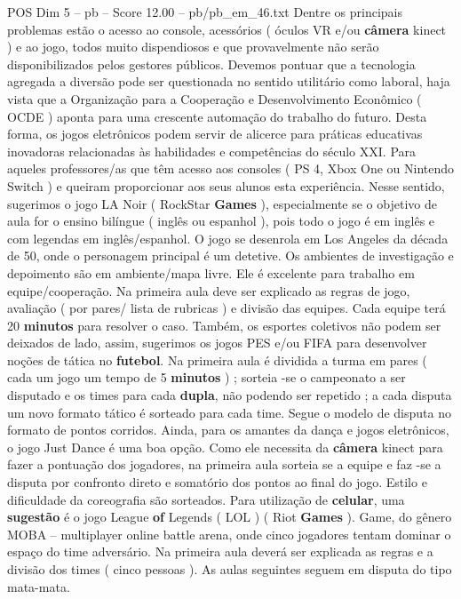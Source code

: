 \begin{textsample}{POS Dim 5 – pb – Score 12.00 – pb/pb\_em\_46.txt}
Dentre os principais problemas estão o acesso ao console, acessórios ( óculos VR e/ou \textbf{câmera} kinect ) e ao jogo, todos muito dispendiosos e que provavelmente não serão disponibilizados pelos gestores públicos.
Devemos pontuar que a tecnologia agregada a diversão pode ser questionada no sentido utilitário como laboral, haja vista que a Organização para a Cooperação e Desenvolvimento Econômico ( OCDE ) aponta para uma crescente automação do trabalho do futuro.
Desta forma, os jogos eletrônicos podem servir de alicerce para práticas educativas inovadoras relacionadas às habilidades e competências do século XXI.
Para aqueles professores/as que têm acesso aos consoles ( PS 4, Xbox One ou Nintendo Switch ) e queiram proporcionar aos seus alunos esta experiência.
Nesse sentido, sugerimos o jogo LA Noir ( RockStar \textbf{Games} ), especialmente se o objetivo de aula for o ensino bilíngue ( inglês ou espanhol ), pois todo o jogo é em inglês e com legendas em inglês/espanhol.
O jogo se desenrola em Los Angeles da década de 50, onde o personagem principal é um detetive.
Os ambientes de investigação e depoimento são em ambiente/mapa livre.
Ele é excelente para trabalho em equipe/cooperação.
Na primeira aula deve ser explicado as regras de jogo, avaliação ( por pares/ lista de rubricas ) e divisão das equipes.
Cada equipe terá 20 \textbf{minutos} para resolver o caso.
Também, os esportes coletivos não podem ser deixados de lado, assim, sugerimos os jogos PES e/ou FIFA para desenvolver noções de tática no \textbf{futebol}.
Na primeira aula é dividida a turma em pares ( cada um jogo um tempo de 5 \textbf{minutos} ) ; sorteia -se o campeonato a ser disputado e os times para cada \textbf{dupla}, não podendo ser repetido ; a cada disputa um novo formato tático é sorteado para cada time.
Segue o modelo de disputa no formato de pontos corridos.
Ainda, para os amantes da dança e jogos eletrônicos, o jogo Just Dance é uma boa opção.
Como ele necessita da \textbf{câmera} kinect para fazer a pontuação dos jogadores, na primeira aula sorteia se a equipe e faz -se a disputa por confronto direto e somatório dos pontos ao final do jogo.
Estilo e dificuldade da coreografia são sorteados.
Para utilização de \textbf{celular}, uma \textbf{sugestão} é o jogo League \textbf{of} Legends ( LOL ) ( Riot \textbf{Games} ).
Game, do gênero MOBA – multiplayer online battle arena, onde cinco jogadores tentam dominar o espaço do time adversário.
Na primeira aula deverá ser explicada as regras e a divisão dos times ( cinco pessoas ).
As aulas seguintes seguem em disputa do tipo mata-mata.

\end{textsample}

